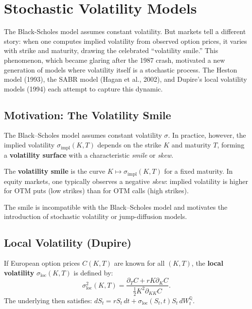 \chapter{Stochastic Volatility Models}
\label{ch:volatility}

The Black-Scholes model assumes constant volatility. But markets tell a different story: when one computes implied volatility from observed option prices, it varies with strike and maturity, drawing the celebrated ``volatility smile.'' This phenomenon, which became glaring after the 1987 crash, motivated a new generation of models where volatility itself is a stochastic process. The Heston model (1993), the SABR model (Hagan et al., 2002), and Dupire's local volatility models (1994) each attempt to capture this dynamic.

\section{Motivation: The Volatility Smile}

The Black--Scholes model assumes constant volatility $\sigma$. In practice,
however, the implied volatility $\sigma_{\text{impl}}(K,T)$ depends on the
strike $K$ and maturity $T$, forming a \textbf{volatility surface} with a
characteristic \textit{smile} or \textit{skew}.

\begin{definition}
The \textbf{volatility smile} is the curve
$K \mapsto \sigma_{\text{impl}}(K, T)$ for a fixed maturity.
In equity markets, one typically observes a negative \textit{skew}:
implied volatility is higher for OTM puts (low strikes) than for
OTM calls (high strikes).
\end{definition}

\begin{remark}
The smile is incompatible with the Black--Scholes model and motivates the
introduction of stochastic volatility or jump-diffusion models.
\end{remark}

\section{Local Volatility (Dupire)}

\begin{theorem}
If European option prices $C(K,T)$ are known for all $(K,T)$, the
\textbf{local volatility} $\sigma_{\text{loc}}(K,T)$ is defined by:
\[
    \sigma_{\text{loc}}^2(K,T) = \frac{\partial_T C + rK\partial_K C}
    {\frac{1}{2}K^2\partial_{KK}C}.
\]
The underlying then satisfies:
$dS_t = rS_t\,dt + \sigma_{\text{loc}}(S_t, t)S_t\,dW_t^\mathbb{Q}$.
\end{theorem}

